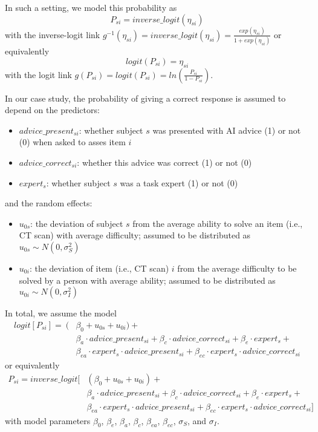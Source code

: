\documentclass[
  man,floatsintext]{apa6}
\providecommand{\tightlist}{%
  \setlength{\itemsep}{0pt}\setlength{\parskip}{0pt}}
\begin{document}
In such a setting, we model this probability as \[
P_{si} = inverse\_logit(\eta_{si})
\] with the inverse-logit link \(g^{-1}(\eta_{si}) = inverse\_logit(\eta_{si}) = \frac{exp(\eta_{si})}{1 + exp(\eta_{si})}\) or equivalently \[
logit(P_{si}) = \eta_{si}
\] with the logit link \(g(P_{si}) = logit(P_{si}) = ln (\frac{P_{si}}{1 - P_{si}})\).

In our case study, the probability of giving a correct response is assumed to depend on the predictors:

\begin{itemize}
\tightlist
\item
  \(advice\_present_{si}\): whether subject \(s\) was presented with AI advice (1) or not (0) when asked to asses item \(i\)
\item
  \(advice\_correct_{si}\): whether this advice was correct (1) or not (0)
\item
  \(expert_s\): whether subject \(s\) was a task expert (1) or not (0)
\end{itemize}

and the random effects:

\begin{itemize}
\tightlist
\item
  \(u_{0s}\): the deviation of subject \(s\) from the average ability to solve an item (i.e., CT scan) with average difficulty; assumed to be distributed as \(u_{0s} \sim N(0, \sigma_S^2)\)
\item
  \(u_{0i}\): the deviation of item (i.e., CT scan) \(i\) from the average difficulty to be solved by a person with average ability; assumed to be distributed as \(u_{0i} \sim N(0, \sigma_I^2)\)
\end{itemize}

In total, we assume the model \[
\begin{aligned}
logit[P_{si}] =\ (&\beta_0 + u_{0s} + u_{0i}) + \\
&\beta_a \cdot advice\_present_{si} + \beta_c \cdot advice\_correct_{si} + \beta_e \cdot expert_s + \\
&\beta_{ea} \cdot expert_{s} \cdot advice\_present_{si} + \beta_{ec} \cdot expert_{s} \cdot advice\_correct_{si}
\end{aligned}
\] or equivalently \[
\begin{aligned}
P_{si} = inverse\_logit[&(\beta_0 + u_{0s} + u_{0i}) + \\
&\beta_a \cdot advice\_present_{si} + \beta_c \cdot advice\_correct_{si} + \beta_e \cdot expert_s + \\
&\beta_{ea} \cdot expert_{s} \cdot advice\_present_{si} + \beta_{ec} \cdot expert_{s} \cdot advice\_correct_{si}]
\end{aligned}
\] with model parameters \(\beta_0\), \(\beta_e\), \(\beta_a\), \(\beta_c\), \(\beta_{ea}\), \(\beta_{ec}\), \(\sigma_S\), and \(\sigma_I\).
\end{document}
